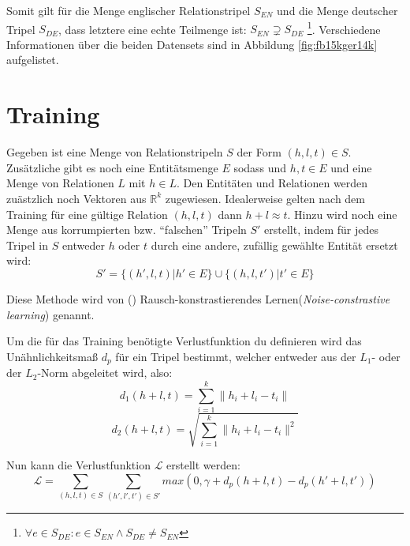 Somit gilt für die Menge englischer Relationstripel $S_{EN}$ und die Menge deutscher Tripel $S_{DE}$, dass letztere
eine echte Teilmenge ist: $S_{EN} \supsetneq S_{DE}$ \footnote{$\forall e \in S_{DE}: e \in S_{EN} \wedge S_{DE} \neq S_{EN}$}.
Verschiedene Informationen über die beiden Datensets sind in Abbildung \ref{fig:fb15kger14k} aufgelistet.

\section{Training}

Gegeben ist eine Menge von Relationstripeln $S$ der Form $(h, l, t) \in S$. Zusätzliche gibt es noch eine Entitätsmenge
$E$ sodass und $h, t \in E$ und eine Menge von Relationen $L$ mit $h \in L$. Den Entitäten und Relationen werden zuästzlich
noch Vektoren aus $\mathbb{R}^k$ zugewiesen. Idealerweise gelten nach dem Training für eine gültige Relation $(h, l, t)$
dann $h + l \approx t$. Hinzu wird noch eine Menge aus korrumpierten bzw. ``falschen'' Tripeln $S'$ erstellt, indem
für jedes Tripel in $S$ entweder $h$ oder $t$ durch eine andere, zufällig gewählte Entität ersetzt wird:
\begin{equation}
  S' = \{(h', l, t) | h' \in E\} \cup \{(h, l, t') | t' \in E\}
\end{equation}

Diese Methode wird von (\cite{bordes2013translating}) Rausch-konstrastierendes Lernen(\emph{Noise-constrastive learning})
genannt.

Um die für das Training benötigte Verlustfunktion du definieren wird das Unähnlichkeitsmaß $d_p$ für ein Tripel bestimmt, welcher
entweder aus der $L_1$- oder der $L_2$-Norm abgeleitet wird, also:
\begin{equation}
    d_1(h + l, t) = \sum_{i=1}^k \| h_i + l_i - t_i \|
\end{equation}
\begin{equation}
    d_2(h + l, t) = \sqrt{\sum_{i=1}^k \| h_i + l_i - t_i \|^2}
\end{equation}

Nun kann die Verlustfunktion $\mathcal{L}$ erstellt werden:
\begin{equation}
  \mathcal{L} = \sum_{(h,l,t) \in S} \sum_{(h', l', t') \in S'} max(0, \gamma + d_p(h + l, t) - d_p(h' + l, t'))
\end{equation}

